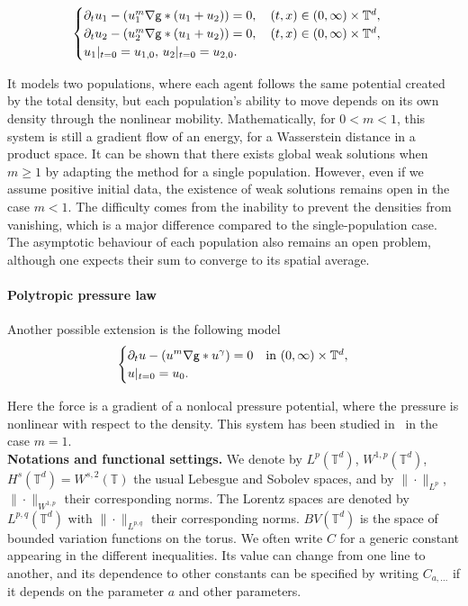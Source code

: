 \documentclass[11pt]{article}
\numberwithin{equation}{section} %
\newcommand{\p}{{\partial}}
\newcommand{\T}{{\mathbb{T}}}
\newcommand{\g}{{\mathsf{g}}}
\let\div\relax
\DeclareMathOperator{\div}{\mathsf{div}}
\def\nab{\nabla}
\begin{document}
\begin{equation}\label{eq:system_PDE}
\begin{cases}
    \p_t u_1 -\div (u_1^m \nab\g\ast (u_1+u_2)) = 0, \quad (t,x)\in (0,\infty)\times \T^d,\\
    \p_t u_2 -\div (u_2^m \nab\g\ast (u_1+u_2)) = 0, \quad (t,x)\in (0,\infty)\times \T^d,\\
    u_{1}\vert_{t=0} = u_{1,0},\, u_{2}\vert_{t=0} = u_{2,0}.
\end{cases}
\end{equation}

It models two populations, where each agent follows the same potential created by the total density, but each population's ability to move depends on its own density through the nonlinear mobility. Mathematically, for $0<m<1$, this system is still a gradient flow of an energy, for a Wasserstein distance in a product space. It can be shown that there exists global weak solutions when $m\ge 1$ by adapting the method for a single population. However, even if we assume positive initial data, the existence of weak solutions remains open in the case $m<1$. The difficulty comes from the inability to prevent the densities from vanishing, which is a major difference compared to the single-population case. The asymptotic behaviour of each population also remains an open problem, although one expects their sum to converge to its spatial average.


\paragraph{Polytropic pressure law}

Another possible extension is the following model
\begin{equation*}
\begin{cases}
\displaystyle\partial_tu - \div (u^m \nab \g \ast u^\gamma )=0 
& \text{in } (0,\infty) \times \T^d,\\
u|_{t=0} = u_0.
\end{cases}
\end{equation*}

Here the force is a gradient of a nonlocal pressure potential, where the pressure is nonlinear with respect to the density. This system has been studied in~\cite{DaoDiaz2025} in the case $m=1$. \\


\textbf{Notations and functional settings.} We denote by $L^{p}(\T^d)$, $W^{1,p}(\T^d)$, $H^{s}(\T^d)=W^{s,2}(\T)$ the usual Lebesgue and Sobolev spaces, and by $\|\cdot\|_{L^{p}}$, $\|\cdot\|_{W^{1,p}}$ their corresponding norms. The Lorentz spaces are denoted by $L^{p,q}(\T^d)$ with $\|\cdot\|_{L^{p,q}}$ their corresponding norms. $BV(\T^d)$ is the space of bounded variation functions on the torus.  
We often write $C$ for a generic constant appearing in the different inequalities. Its value can change from one line to another, and its dependence to other constants can be specified by writing $C_{a,...}$ if it depends on the parameter $a$ and other parameters. 
\end{document}
